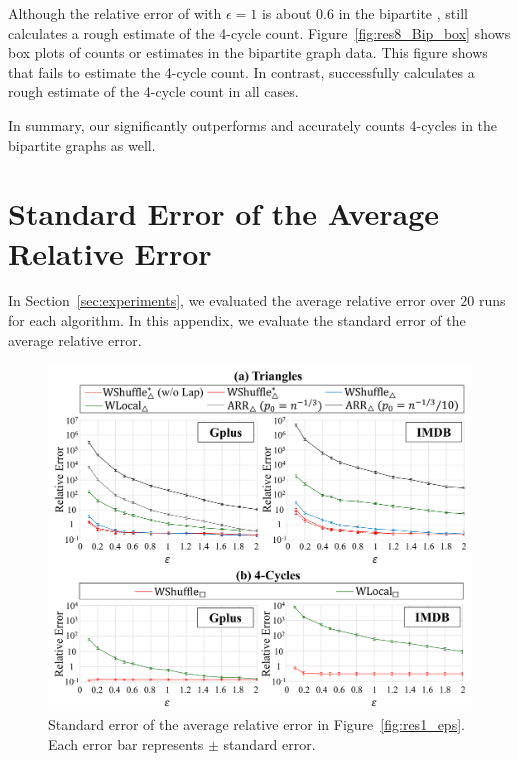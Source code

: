 Although the relative error of \AlgWSCyc{} with $\epsilon=1$ is about $0.6$ in the bipartite \IMDB{}, \AlgWSCyc{} still calculates a rough estimate of the 4-cycle count.
Figure~\ref{fig:res8_Bip_box} shows box plots of counts or estimates in the bipartite graph data.
This figure shows that \AlgWLCyc{} fails to estimate the 4-cycle count.
In contrast, \AlgWSCyc{} successfully calculates a rough estimate of the 4-cycle count in all cases.

In summary, our \AlgWSCyc{} significantly outperforms \AlgWLCyc{} and accurately counts 4-cycles in the bipartite graphs as well.

\section{Standard Error of the Average Relative Error}
\label{sec:standard_error}

In Section~\ref{sec:experiments}, we evaluated the average relative error over $20$ runs for each algorithm. 
In this appendix, we evaluate the standard error of the average relative error. 

\begin{figure}[t]
  \centering
  \includegraphics[width=0.99\linewidth]{fig/res9_std_err.pdf}
  \vspace{-4mm}
  \caption{Standard error of the average relative error in Figure~\ref{fig:res1_eps}. 
  Each error bar represents $\pm$ standard error.
  }
  \label{fig:res9_std_err}
\end{figure}

